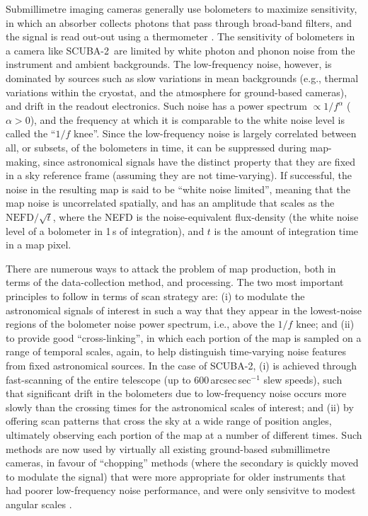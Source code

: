 \documentclass[useAMS,usenatbib,nofootinbib]{mn2e}
\newcommand{\scuba}{SCUBA-2}
\begin{document}
Submillimetre imaging cameras generally use bolometers to maximize
sensitivity, in which an absorber collects photons that pass through
broad-band filters, and the signal is read out-out using a thermometer
\citep[e.g.][]{griffin2002}. The sensitivity of bolometers in a camera
like \scuba\ are limited by white photon and phonon noise from the
instrument and ambient backgrounds. The low-frequency noise, however,
is dominated by sources such as slow variations in mean backgrounds
(e.g., thermal variations within the cryostat, and the atmosphere for
ground-based cameras), and drift in the readout electronics. Such
noise has a power spectrum $\propto 1/f^\alpha$ ($\alpha>0$), and the
frequency at which it is comparable to the white noise level is called
the ``$1/f$ knee''. Since the low-frequency noise is largely
correlated between all, or subsets, of the bolometers in time, it can
be suppressed during map-making, since astronomical signals have the
distinct property that they are fixed in a sky reference frame
(assuming they are not time-varying). If successful, the noise in the
resulting map is said to be ``white noise limited'', meaning that the
map noise is uncorrelated spatially, and has an amplitude that scales
as the $\mathrm{NEFD}/\sqrt{t}$, where the NEFD is the
noise-equivalent flux-density (the white noise level of a bolometer in
1\,s of integration), and $t$ is the amount of integration time in a
map pixel.

There are numerous ways to attack the problem of map production, both
in terms of the data-collection method, and processing. The two most
important principles to follow in terms of scan strategy are: (i) to
modulate the astronomical signals of interest in such a way that they
appear in the lowest-noise regions of the bolometer noise power
spectrum, i.e., above the $1/f$ knee; and (ii) to provide good
``cross-linking'', in which each portion of the map is sampled on a
range of temporal scales, again, to help distinguish time-varying
noise features from fixed astronomical sources. In the case of \scuba,
(i) is achieved through fast-scanning of the entire telescope (up to
600\,arcsec\,sec$^{-1}$ slew speeds), such that significant drift in
the bolometers due to low-frequency noise occurs more slowly than the
crossing times for the astronomical scales of interest; and (ii) by
offering scan patterns that cross the sky at a wide range of position
angles, ultimately observing each portion of the map at a number of
different times. Such methods are now used by virtually all existing
ground-based submillimetre cameras, in favour of ``chopping'' methods
(where the secondary is quickly moved to modulate the signal) that
were more appropriate for older instruments that had poorer
low-frequency noise performance, and were only sensivitve to modest
angular scales
\citep[e.g.][]{glenn1998,weferling2002,wilson2008,kovacs2008b}.
\end{document}
